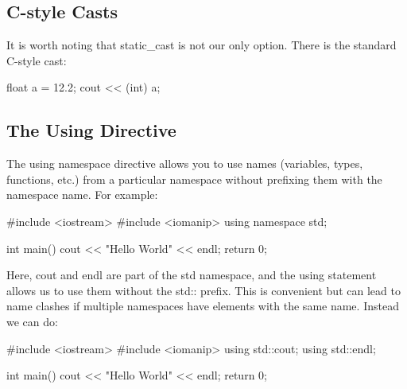 \documentclass{report}
\begin{document}
    \bigbreak \noindent 
    \subsection{C-style Casts}
    \bigbreak \noindent 
    It is worth noting that static\_cast is not our only option. There is the standard C-style cast:
    \bigbreak \noindent 
    
    \begin{cppcode}
float a = 12.2;
cout << (int) a;
    \end{cppcode}
    
    




    \pagebreak \bigbreak \noindent 
    \subsection{The Using Directive}
    \bigbreak \noindent 
    The using namespace directive allows you to use names (variables, types, functions, etc.) from a particular namespace without prefixing them with the namespace name. For example:
    \bigbreak \noindent 
    
    \begin{cppcode}
#include <iostream>
#include <iomanip>
using namespace std;

int main(){
    cout << "Hello World" << endl;
    return 0;
}
    \end{cppcode}
    
    \bigbreak \noindent 
    Here, cout and endl are part of the std namespace, and the using statement allows us to use them without the std:: prefix. This is convenient but can lead to name clashes if multiple namespaces have elements with the same name. Instead we can do:
    \bigbreak \noindent 
    
    \begin{cppcode}
#include <iostream>
#include <iomanip>
using std::cout;
using std::endl;

int main(){
    cout << "Hello World" << endl;
    return 0;
}
    \end{cppcode}
    
\end{document}
